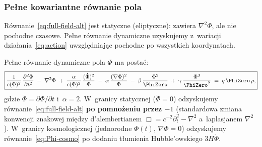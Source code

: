 \subsubsection{Pe\l{}ne kowariantne r\'ownanie pola}

R\'ownanie~\eqref{eq:full-field-alt} jest statyczne (eliptyczne):
zawiera $\nabla^2\Phi$, ale nie pochodne czasowe. Pe\l{}ne
r\'ownanie dynamiczne uzyskujemy z~wariacji dzia\l{}ania~\eqref{eq:action}
uwzgl\k{e}dniaj\k{a}c pochodne po wszystkich koordynatach.

\begin{theorem}\label{thm:covariant-field}
Pe\l{}ne r\'ownanie dynamiczne pola $\Phi$ ma posta\'c:
\begin{equation}\label{eq:covariant-field}
  \boxed{
    \frac{1}{c(\Phi)^2}\,\frac{\partial^2\Phi}{\partial t^2}
    \;-\; \nabla^2\Phi
    \;+\;
    \frac{\alpha}{c(\Phi)^2}\,\frac{(\dot\Phi)^2}{\Phi}
    \;-\;
    \alpha\,\frac{(\nabla\Phi)^2}{\Phi}
    \;-\;
    \beta\,\frac{\Phi^2}{\PhiZero}
    \;+\;
    \gamma\,\frac{\Phi^3}{\PhiZero^2}
    \;=\;
    q\,\PhiZero\,\rho,
  }
\end{equation}
gdzie $\dot\Phi = \partial\Phi/\partial t$ i~$\alpha = 2$.
W~granicy statycznej ($\dot\Phi = 0$) odzyskujemy
r\'ownanie~\eqref{eq:full-field-alt} \textbf{po pomno\.zeniu
przez $-1$} (standardowa zmiana konwencji znakowej
mi\k{e}dzy d'alembertianem $\Box = c^{-2}\partial_t^2 - \nabla^2$
a~laplasjanem $\nabla^2$). W~granicy kosmologicznej
(jednorodne $\Phi(t)$, $\nabla\Phi = 0$) odzyskujemy
r\'ownanie~\eqref{eq:Phi-cosmo} po dodaniu t\l{}umienia
Hubble'owskiego $3H\dot\Phi$.
\end{theorem}

